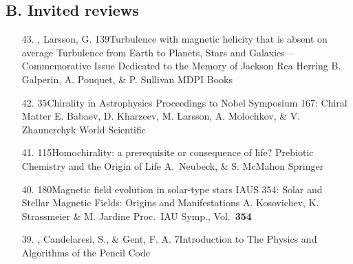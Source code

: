 \subsection*{B. Invited reviews} %
\begin{itemize}


\item[43.]
\Brandenburg, Larsson, G.
{139}{Turbulence with magnetic helicity that is absent on average}
{Turbulence from Earth to Planets, Stars and Galaxies—Commemorative Issue Dedicated to the Memory of Jackson Rea Herring}
{B. Galperin, A. Pouquet, \& P. Sullivan}
{MDPI Books}

\item[42.]
\Brandenburg{}
{35}{Chirality in Astrophysics}
{Proceedings to Nobel Symposium 167: Chiral Matter}
{E. Babaev, D. Kharzeev, M. Larsson, A. Molochkov, \& V. Zhaunerchyk}
{World Scientific}

\item[41.]
\Brandenburg{}
{115}{Homochirality: a prerequisite or consequence of life?}
{Prebiotic Chemistry and the Origin of Life}
{A.\ Neubeck, \& S. McMahon}
{Springer}

\item[40.]
\Brandenburg{}
{180}{Magnetic field evolution in solar-type stars}
{IAUS 354: Solar and Stellar Magnetic Fields: Origins and Manifestations}
{A. Kosovichev, K. Strassmeier \& M. Jardine}
{Proc.\ IAU Symp., Vol.\ {\bf 354}}

\item[39.]
\Brandenburg, Candelaresi, S., \& Gent, F. A.
{7}{Introduction to {\sf The Physics and Algorithms of the Pencil Code}}


\end{itemize}

